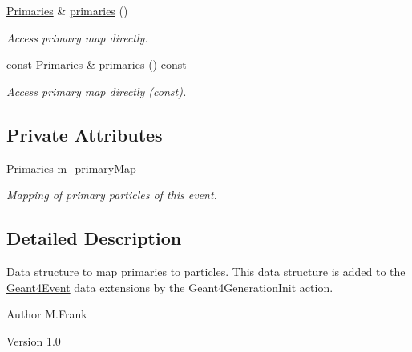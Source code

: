 \begin{DoxyCompactItemize}
\hyperlink{class_d_d4hep_1_1_simulation_1_1_geant4_primary_map_aec80e9bb254e582ef410dc65da5809c3}{Primaries} \& \hyperlink{class_d_d4hep_1_1_simulation_1_1_geant4_primary_map_a3c59e375ae3f9c00b5924a627cf73241}{primaries} ()
\begin{DoxyCompactList}\small\item\em Access primary map directly. \item\end{DoxyCompactList}\item 
const \hyperlink{class_d_d4hep_1_1_simulation_1_1_geant4_primary_map_aec80e9bb254e582ef410dc65da5809c3}{Primaries} \& \hyperlink{class_d_d4hep_1_1_simulation_1_1_geant4_primary_map_a1eb1af14b00a614c5402bdf6c050fef7}{primaries} () const 
\begin{DoxyCompactList}\small\item\em Access primary map directly (const). \item\end{DoxyCompactList}\end{DoxyCompactItemize}
\subsection*{Private Attributes}
\begin{DoxyCompactItemize}
\item 
\hyperlink{class_d_d4hep_1_1_simulation_1_1_geant4_primary_map_aec80e9bb254e582ef410dc65da5809c3}{Primaries} \hyperlink{class_d_d4hep_1_1_simulation_1_1_geant4_primary_map_aa3b3cffcec11c5ced24ca4f9ac4e6bde}{m\_\-primaryMap}
\begin{DoxyCompactList}\small\item\em Mapping of primary particles of this event. \item\end{DoxyCompactList}\end{DoxyCompactItemize}


\subsection{Detailed Description}
Data structure to map primaries to particles. This data structure is added to the \hyperlink{class_d_d4hep_1_1_simulation_1_1_geant4_event}{Geant4Event} data extensions by the Geant4GenerationInit action.

\begin{DoxyAuthor}{Author}
M.Frank 
\end{DoxyAuthor}
\begin{DoxyVersion}{Version}
1.0 
\end{DoxyVersion}


